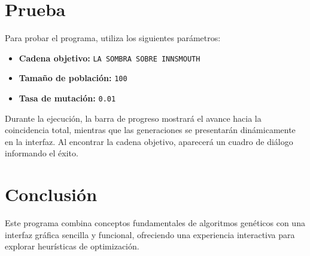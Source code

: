 \documentclass{article}
\begin{document}
\section*{Prueba}

Para probar el programa, utiliza los siguientes parámetros:

\begin{itemize}
    \item \textbf{Cadena objetivo:} \texttt{LA SOMBRA SOBRE INNSMOUTH}
    \item \textbf{Tamaño de población:} \texttt{100}
    \item \textbf{Tasa de mutación:} \texttt{0.01}
\end{itemize}

Durante la ejecución, la barra de progreso mostrará el avance hacia la coincidencia total, mientras que las generaciones se presentarán dinámicamente en la interfaz. Al encontrar la cadena objetivo, aparecerá un cuadro de diálogo informando el éxito.

\section*{Conclusión}

Este programa combina conceptos fundamentales de algoritmos genéticos con una interfaz gráfica sencilla y funcional, ofreciendo una experiencia interactiva para explorar heurísticas de optimización.
\end{document}
